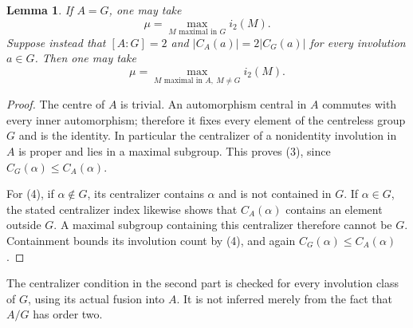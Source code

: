 \documentclass[11pt,a4paper]{article}
\newtheorem{lemma}[theorem]{Lemma}
\newcommand{\ii}{i_2}
\begin{document}
\begin{lemma}\label{mu}
If $A=G$, one may take
\[
             \mu=\max_{M\text{ maximal in }G}\ii(M).          \tag{3}
\]
Suppose instead that $[A:G]=2$ and
$|C_A(a)|=2|C_G(a)|$ for every involution $a\in G$.
Then one may take
\[
        \mu=\max_{M\text{ maximal in }A,\ M\ne G}\ii(M).     \tag{4}
\]
\end{lemma}
\begin{proof}
The centre of $A$ is trivial. An automorphism central in $A$ commutes
with every inner automorphism; therefore it fixes every element of
the centreless group $G$ and is the identity. In particular the
centralizer of a nonidentity involution in $A$ is proper and lies in
a maximal subgroup. This proves (3), since
$C_G(\alpha)\le C_A(\alpha)$.

For (4), if $\alpha\notin G$, its centralizer contains $\alpha$
and is not contained in $G$. If $\alpha\in G$, the stated centralizer
index likewise shows that $C_A(\alpha)$ contains an element outside
$G$. A maximal subgroup containing this centralizer therefore cannot
be $G$. Containment bounds its involution count by (4), and again
$C_G(\alpha)\le C_A(\alpha)$.
\end{proof}

The centralizer condition in the second part is checked for every
involution class of $G$, using its actual fusion into $A$. It is not
inferred merely from the fact that $A/G$ has order two.
\end{document}
